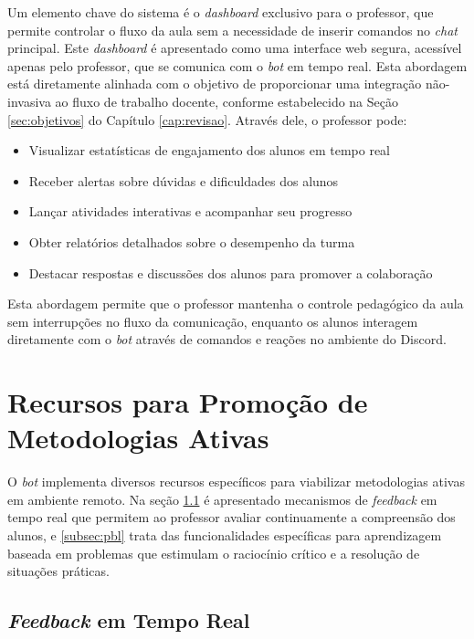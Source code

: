 Um elemento chave do sistema é o \textit{dashboard} exclusivo para o professor,
que permite controlar o fluxo da aula sem a necessidade de inserir comandos no
\textit{chat} principal. Este \textit{dashboard} é apresentado como uma
interface web segura, acessível apenas pelo professor, que se comunica com o
\textit{bot} em tempo real. Esta abordagem está diretamente alinhada com o
objetivo de proporcionar uma integração não-invasiva ao fluxo de trabalho
docente, conforme estabelecido na Seção \ref{sec:objetivos} do Capítulo
\ref{cap:revisao}. Através dele, o professor pode:

\begin{itemize}
\item Visualizar estatísticas de engajamento dos alunos em tempo real
\item Receber alertas sobre dúvidas e dificuldades dos alunos
\item Lançar atividades interativas e acompanhar seu progresso
\item Obter relatórios detalhados sobre o desempenho da turma
\item Destacar respostas e discussões dos alunos para promover a colaboração
\end{itemize}

Esta abordagem permite que o professor mantenha o controle pedagógico da aula
sem interrupções no fluxo da comunicação, enquanto os alunos interagem
diretamente com o \textit{bot} através de comandos e reações no ambiente do
Discord.

\section{Recursos para Promoção de Metodologias Ativas}
\label{sec:recursos}

O \textit{bot} implementa diversos recursos específicos para viabilizar
metodologias ativas em ambiente remoto. Na seção \ref{subsec:feedback} é
apresentado mecanismos de \textit{feedback} em tempo real que permitem ao
professor avaliar continuamente a compreensão dos alunos, e \ref{subsec:pbl}
trata das funcionalidades específicas para aprendizagem baseada em problemas que
estimulam o raciocínio crítico e a resolução de situações práticas.

\subsection{\textit{Feedback} em Tempo Real}
\label{subsec:feedback}

